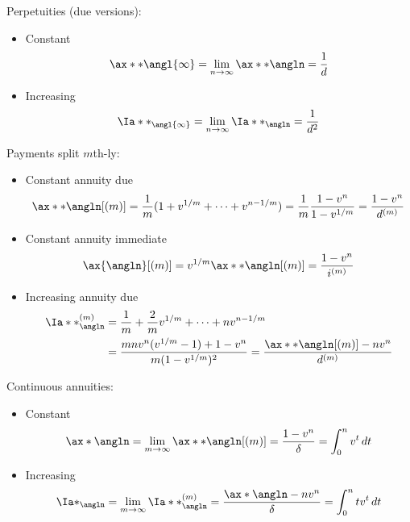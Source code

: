 Perpetuities (due versions):
\begin{itemize}
\item Constant
\begin{equation*}
\ax**{\angl{\infty}} = \lim_{n\to\infty}\ax**{\angln} = \frac{1}{d}
\end{equation*}
\item Increasing
\begin{equation*}
\Ia**_{\angl{\infty}} = \lim_{n\to\infty}\Ia**_{\angln} = \frac{1}{d^2}
\end{equation*}
\end{itemize}

Payments split $m$th-ly:
\begin{itemize}
\item Constant annuity due
\begin{equation*}
\ax**{\angln}[(m)] = \frac{1}{m}(1 + v^{1/m} + \cdots + v^{n - 1/m}) = \frac{1}{m}\frac{1 - v^n}{1 - v^{1/m}} = \frac{1 - v^n}{d^{(m)}}
\end{equation*}
\item Constant annuity immediate
\begin{equation*}
\ax{\angln}[(m)] = v^{1/m}\ax**{\angln}[(m)] = \frac{1 - v^n}{i^{(m)}}
\end{equation*}
\item Increasing annuity due
\begin{equation*}
\begin{split}
\Ia**_{\angln}^{(m)} &= \frac{1}{m} + \frac{2}{m}v^{1/m} + \cdots + nv^{n - 1/m} \\
&= \frac{mnv^n(v^{1/m} - 1) + 1 - v^n}{m(1 - v^{1/m})^2} = \frac{\ax**{\angln}[(m)] - nv^n}{d^{(m)}}
\end{split}
\end{equation*}
\end{itemize}

\newpage
Continuous annuities:
\begin{itemize}
\item Constant
\begin{equation*}
\ax*{\angln} = \lim_{m\to\infty} \ax**{\angln}[(m)] = \frac{1 - v^n}{\delta} = \int_0^n v^t\,dt
\end{equation*}
\item Increasing 
\begin{equation*}
\Ia*_{\angln} = \lim_{m\to\infty} \Ia**_{\angln}^{(m)} = \frac{\ax*{\angln} - nv^n}{\delta} = \int_0^n tv^t\,dt
\end{equation*}
\end{itemize}